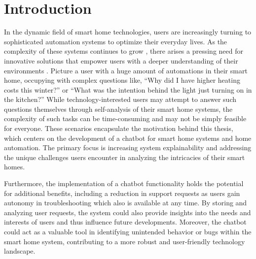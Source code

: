 \chapter{Introduction}

In the dynamic field of smart home technologies, users are increasingly turning to sophisticated automation systems to optimize their everyday lives.
As the complexity of these systems continues to grow \cite{technologies11010009}, there arises a pressing need for innovative solutions that empower users with a deeper understanding of their environments \cite{baby_home_2017}. 
Picture a user with a huge amount of automations in their smart home, occupying with complex questions like, ``Why did I have higher heating costs this winter?'' or ``What was the intention behind the light just turning on in the kitchen?''
While technology-interested users may attempt to answer such questions themselves through self-analysis of their smart home systems, the complexity of such tasks can be time-consuming and may not be simply feasible for everyone.
These scenarios encapsulate the motivation behind this thesis, which centers on the development of a chatbot for smart home systems and home automation.
The primary focus is increasing system explainability and addressing the unique challenges users encounter in analyzing the intricacies of their smart homes.

Furthermore, the implementation of a chatbot functionality holds the potential for additional benefits, including a reduction in support requests as users gain autonomy in troubleshooting \cite{HUANG2024103600} which also is available at any time. 
By storing and analyzing user requests, the system could also provide insights into the needs and interests of users and thus influence future developments. 
Moreover, the chatbot could act as a valuable tool in identifying unintended behavior or bugs within the smart home system, contributing to a more robust and user-friendly technology landscape.

